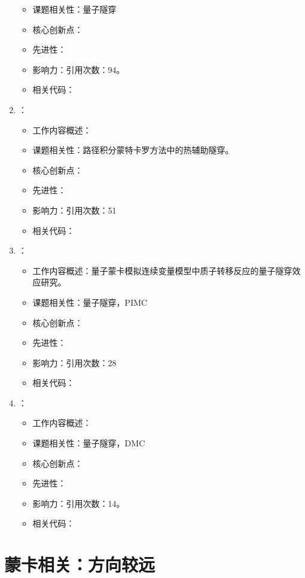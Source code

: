 \begin{enumerate}
\begin{itemize}
                \item 课题相关性：量子隧穿
                \item 核心创新点：
                \item 先进性：
                \item 影响力：引用次数：94。
                \item 相关代码：
            \end{itemize}
            \item \citet{jiang2017scaling}：
            \begin{itemize}
                \item 工作内容概述：
                \item 课题相关性：路径积分蒙特卡罗方法中的热辅助隧穿。
                \item 核心创新点：
                \item 先进性：
                \item 影响力：引用次数：51
                \item 相关代码：
            \end{itemize}
            \item \citet{mazzola2017quantum}：
            \begin{itemize}
                \item 工作内容概述：量子蒙卡模拟连续变量模型中质子转移反应的量子隧穿效应研究。
                \item 课题相关性：量子隧穿，PIMC
                \item 核心创新点：
                \item 先进性：
                \item 影响力：引用次数：28
                \item 相关代码：
            \end{itemize}
        \item \citet{inack2018understanding}：
            \begin{itemize}
                \item 工作内容概述：
                \item 课题相关性：量子隧穿，DMC
                \item 核心创新点：
                \item 先进性：
                \item 影响力：引用次数：14。
                \item 相关代码：
            \end{itemize}

    \end{enumerate}
    
\section{蒙卡相关：方向较远}